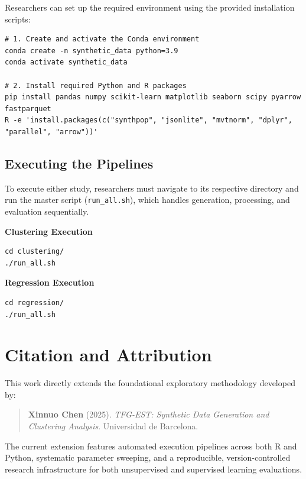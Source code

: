 Researchers can set up the required environment using the provided installation scripts:

\begin{verbatim}
# 1. Create and activate the Conda environment
conda create -n synthetic_data python=3.9
conda activate synthetic_data

# 2. Install required Python and R packages
pip install pandas numpy scikit-learn matplotlib seaborn scipy pyarrow fastparquet
R -e 'install.packages(c("synthpop", "jsonlite", "mvtnorm", "dplyr", "parallel", "arrow"))'
\end{verbatim}

\subsection{Executing the Pipelines}
To execute either study, researchers must navigate to its respective directory and run the master script (\texttt{run\_all.sh}), which handles generation, processing, and evaluation sequentially.

\vspace{0.3cm}
\noindent\textbf{Clustering Execution}
\begin{verbatim}
cd clustering/
./run_all.sh
\end{verbatim}

\vspace{0.3cm}
\noindent\textbf{Regression Execution}
\begin{verbatim}
cd regression/
./run_all.sh
\end{verbatim}

\section{Citation and Attribution}
This work directly extends the foundational exploratory methodology developed by:
\begin{quote}
    \textbf{Xinnuo Chen} (2025). \textit{TFG-EST: Synthetic Data Generation and Clustering Analysis}. Universidad de Barcelona.
\end{quote}
The current extension features automated execution pipelines across both R and Python, systematic parameter sweeping, and a reproducible, version-controlled research infrastructure for both unsupervised and supervised learning evaluations.
